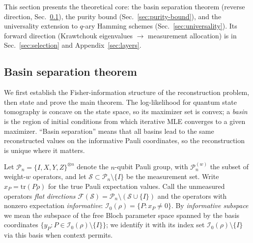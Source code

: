 \documentclass[twocolumn,prx,aps,superscriptaddress,longbibliography,floatfix]{revtex4-2}
\begin{document}
This section presents the theoretical core: the basin separation
theorem (reverse direction, Sec.~\ref{sec:basin}), the purity bound
(Sec.~\ref{sec:purity-bound}), and the universality extension to
$q$-ary Hamming schemes (Sec.~\ref{sec:universality}).
Its forward direction (Krawtchouk eigenvalues $\to$ measurement
allocation) is in Sec.~\ref{sec:selection} and
Appendix~\ref{sec:layers}.

\subsection{Basin separation theorem}
\label{sec:basin}

We first establish the Fisher-information structure of the
reconstruction problem, then state and prove the main theorem.
The log-likelihood for quantum state tomography is concave on
the state space, so its maximizer set is convex; a \emph{basin}
is the region of initial conditions from which iterative MLE
converges to a given maximizer.
``Basin separation'' means that all basins lead to the same
reconstructed values on the informative Pauli coordinates,
so the reconstruction is unique where it matters.

Let $\mathcal{P}_n = \{I,X,Y,Z\}^{\otimes n}$ denote the $n$-qubit
Pauli group, with $\mathcal{P}_n^{(w)}$ the subset of weight-$w$
operators, and let $\mathcal{S} \subset \mathcal{P}_n \setminus \{I\}$ be
the measurement set.
Write $x_P = \mathrm{tr}(P\rho)$ for the true Pauli expectation values.
Call the unmeasured operators \emph{flat directions}
$\mathcal{F}(\mathcal{S}) = \mathcal{P}_n \setminus (\mathcal{S} \cup \{I\})$ and
the operators with nonzero expectation \emph{informative}:
$\mathcal{I}_0(\rho) = \{P : x_P \neq 0\}$.
By \emph{informative subspace} we mean the subspace of the free
Bloch parameter space spanned by the basis coordinates
$\{y_P : P \in \mathcal{I}_0(\rho) \setminus \{I\}\}$; we identify
it with its index set $\mathcal{I}_0(\rho) \setminus \{I\}$ via
this basis when context permits.
\end{document}
